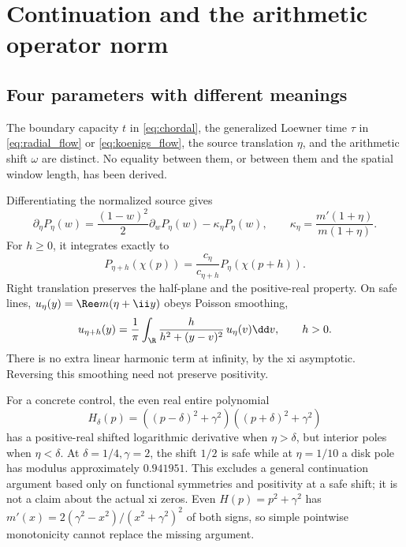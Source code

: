 \section{Continuation and the arithmetic operator norm}
\label{sec:limits}

\subsection{Four parameters with different meanings}

The boundary capacity $t$ in \eqref{eq:chordal}, the generalized Loewner
time $\tau$ in \eqref{eq:radial_flow} or \eqref{eq:koenigs_flow}, the
source translation $\eta$, and the arithmetic shift $\omega$ are distinct.
No equality between them, or between them and the spatial window length,
has been derived.

Differentiating the normalized source gives
\begin{equation}
 \partial_\eta P_\eta(w)
 =\frac{(1-w)^2}{2}\partial_wP_\eta(w)
 -\kappa_\eta P_\eta(w),\qquad
 \kappa_\eta=\frac{m'(1+\eta)}{m(1+\eta)}.
 \label{eq:source_transport}
\end{equation}
For $h\ge0$, it integrates exactly to
\begin{equation}
 P_{\eta+h}(\chi(p))=
 \frac{c_\eta}{c_{\eta+h}}P_\eta(\chi(p+h)).
 \label{eq:translation_composition}
\end{equation}
Right translation preserves the half-plane and the positive-real property.
On safe lines, $u_\eta(y)=\Ree m(\eta+\ii y)$ obeys Poisson smoothing,
\begin{equation}
 u_{\eta+h}(y)=\frac1\pi\int_\R
 \frac{h}{h^2+(y-v)^2}\,u_\eta(v)\dd v,\qquad h>0.
\end{equation}
There is no extra linear harmonic term at infinity, by the xi asymptotic.
Reversing this smoothing need not preserve positivity.

For a concrete control, the even real entire polynomial
\begin{equation}
 H_\delta(p)=((p-\delta)^2+\gamma^2)((p+\delta)^2+\gamma^2)
\end{equation}
has a positive-real shifted logarithmic derivative when $\eta>\delta$,
but interior poles when $\eta<\delta$. At $\delta=1/4,\gamma=2$,
the shift $1/2$ is safe while at $\eta=1/10$ a disk pole has modulus
approximately $0.941951$. This excludes a general continuation argument
based only on functional symmetries and positivity at a safe shift; it is
not a claim about the actual xi zeros. Even $H(p)=p^2+\gamma^2$ has
$m'(x)=2(\gamma^2-x^2)/(x^2+\gamma^2)^2$ of both signs, so simple
pointwise monotonicity cannot replace the missing argument.


